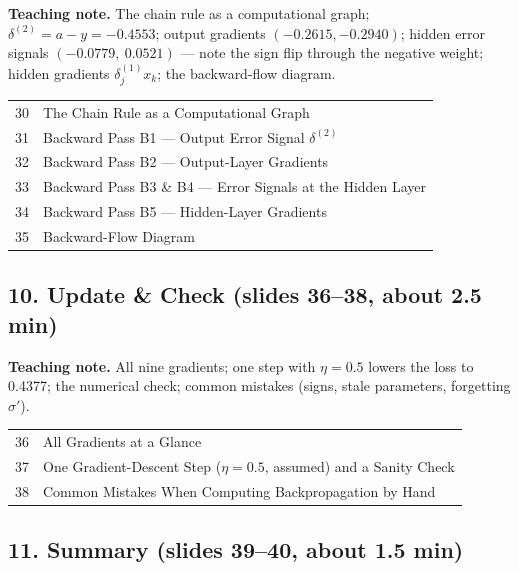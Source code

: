 \documentclass[11pt]{article}
\begin{document}
\textbf{Teaching note.} The chain rule as a computational graph; $\delta^{(2)}=a-y=-0.4553$; output gradients $(-0.2615,-0.2940)$; hidden error signals $(-0.0779,\ 0.0521)$ --- note the sign flip through the negative weight; hidden gradients $\delta^{(1)}_jx_k$; the backward-flow diagram.

\begin{center}\small\renewcommand{\arraystretch}{1.1}\begin{tabularx}{\textwidth}{@{}r X@{}}30 & The Chain Rule as a Computational Graph\\
31 & Backward Pass B1 --- Output Error Signal $\delta^{(2)}$\\
32 & Backward Pass B2 --- Output-Layer Gradients\\
33 & Backward Pass B3 \& B4 --- Error Signals at the Hidden Layer\\
34 & Backward Pass B5 --- Hidden-Layer Gradients\\
35 & Backward-Flow Diagram\\\end{tabularx}\end{center}

\subsection{10. Update \& Check \normalfont\small\color{GreyN}(slides 36--38, about 2.5 min)}

\textbf{Teaching note.} All nine gradients; one step with $\eta=0.5$ lowers the loss to 0.4377; the numerical check; common mistakes (signs, stale parameters, forgetting $\sigma'$).

\begin{center}\small\renewcommand{\arraystretch}{1.1}\begin{tabularx}{\textwidth}{@{}r X@{}}36 & All Gradients at a Glance\\
37 & One Gradient-Descent Step ($\eta=0.5$, assumed) and a Sanity Check\\
38 & Common Mistakes When Computing Backpropagation by Hand\\\end{tabularx}\end{center}

\subsection{11. Summary \normalfont\small\color{GreyN}(slides 39--40, about 1.5 min)}
\end{document}
